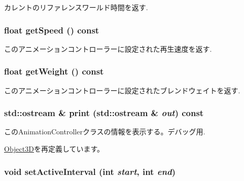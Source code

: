 カレントのリファレンスワールド時間を返す. \hypertarget{classm3g_1_1AnimationController_4ab87c5df7c3eadd17b318a426773fcb}{
\subsubsection[{getSpeed}]{\setlength{\rightskip}{0pt plus 5cm}float getSpeed () const}}
\label{classm3g_1_1AnimationController_4ab87c5df7c3eadd17b318a426773fcb}


このアニメーションコントローラーに設定された再生速度を返す. \hypertarget{classm3g_1_1AnimationController_a17d38dafd3d75c59f0609f037fbe5ae}{
\subsubsection[{getWeight}]{\setlength{\rightskip}{0pt plus 5cm}float getWeight () const}}
\label{classm3g_1_1AnimationController_a17d38dafd3d75c59f0609f037fbe5ae}


このアニメーションコントローラーに設定されたブレンドウェイトを返す. \hypertarget{classm3g_1_1AnimationController_6fea17fa1532df3794f8cb39cb4f911f}{
\subsubsection[{print}]{\setlength{\rightskip}{0pt plus 5cm}std::ostream \& print (std::ostream \& {\em out}) const}}
\label{classm3g_1_1AnimationController_6fea17fa1532df3794f8cb39cb4f911f}


このAnimationControllerクラスの情報を表示する。デバッグ用. 

\hyperlink{classm3g_1_1Object3D_6fea17fa1532df3794f8cb39cb4f911f}{Object3D}を再定義しています。\hypertarget{classm3g_1_1AnimationController_a4cba877288d7a188477e0a756fd2f58}{
\subsubsection[{setActiveInterval}]{\setlength{\rightskip}{0pt plus 5cm}void setActiveInterval (int {\em start}, \/  int {\em end})}}
\label{classm3g_1_1AnimationController_a4cba877288d7a188477e0a756fd2f58}


